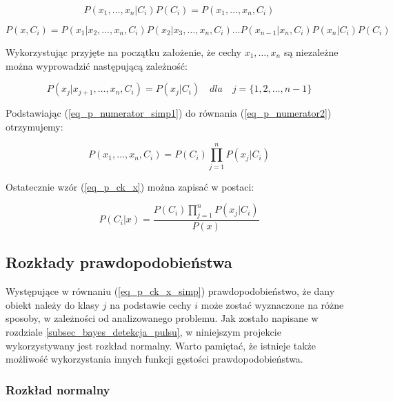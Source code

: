 	\begin{equation}
	\label{eq_p_numerator1}
		P(x_1, \dots , x_n | C_i)P(C_i) = P(x_1, \dots, x_n, C_i)
	\end{equation}

	\begin{equation}
	\label{eq_p_numerator2}
		P(x, C_i) = P(x_1 | x_2 , \dots , x_n, C_i)P(x_2 | x_3, \dots , x_n, 	C_i) \dots P(x_{n-1} | x_n, C_i)P(x_n | C_i)P(C_i)
	\end{equation}
	
Wykorzystując przyjęte na początku założenie, że cechy ${x_1, \dots, x_n}$ są niezależne można wyprowadzić następującą zależność:

	\begin{equation}
	\label{eq_p_numerator_simp1}
		P(x_j | x_{j+1}, \dots , x_n, C_i) = P(x_j | C_i) \quad dla \quad j = \{1, 2, \dots, n-1\}
	\end{equation}

Podstawiając (\ref{eq_p_numerator_simp1}) do równania (\ref{eq_p_numerator2}) otrzymujemy:
	
	\begin{equation}
	\label{eq_p_numerator_simp2}
		P(x_1, \dots, x_n, C_i) = P(C_i) \prod_{j = 1}^n P(x_j | C_i)
	\end{equation}

Ostatecznie wzór (\ref{eq_p_ck_x}) można zapisać w postaci:

	\begin{equation}
	\label{eq_p_ck_x_simp}
		P(C_i | x) = \frac{P(C_i) \prod_{j = 1}^n P(x_j | C_i)}{P(x)}
	\end{equation}


\subsection{Rozkłady prawdopodobieństwa}
\label{sec_rozklady}

Występujące w równaniu (\ref{eq_p_ck_x_simp}) prawdopodobieństwo, że dany obiekt należy do klasy $j$ na podstawie cechy $i$ może zostać wyznaczone na różne sposoby, w zależności od analizowanego problemu. Jak zostało napisane w rozdziale \ref{subsec_bayes_detekcja_pulsu}, w niniejszym projekcie wykorzystywany jest rozkład normalny. Warto pamiętać, że istnieje także możliwość wykorzystania innych funkcji gęstości prawdopodobieństwa. 

\subsubsection{Rozkład normalny}
\label{subsec_gauss}

